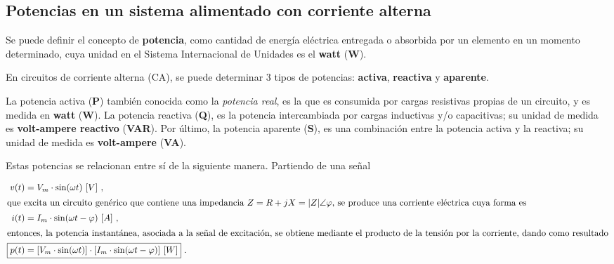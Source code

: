 \subsection{Potencias en un sistema alimentado con corriente alterna}

   Se puede definir el concepto de \textbf{potencia}, como cantidad de energía eléctrica 
  entregada o absorbida por un elemento en un momento determinado, cuya unidad en el Sistema 
  Internacional de Unidades es el \textbf{watt} (\textbf{W}).

   En circuitos de corriente alterna (CA), se puede determinar 3 tipos de potencias:
   \textbf{activa}, \textbf{reactiva} y \textbf{aparente}.

  La potencia activa (\textbf{P}) también conocida como la \textit{potencia real}, es la que
  es consumida por cargas resistivas propias de un circuito, y es medida 
  en \textbf{watt} (\textbf{W}). La potencia reactiva (\textbf{Q}), es la potencia 
  intercambiada por cargas inductivas y/o capacitivas; su unidad de medida es 
  \textbf{volt-ampere reactivo} (\textbf{VAR}). Por último, la potencia aparente (\textbf{S}),
  es una combinación entre la potencia activa y la reactiva; su unidad de medida es 
  \textbf{volt-ampere } (\textbf{VA}).

  Estas potencias se relacionan entre sí de la siguiente manera. Partiendo de una señal

        \begin{align}
            v(t)   &= V_m \cdot \sin(\omega t)\ [V] ~, \notag \\
            \intertext{que excita un circuito genérico que contiene una impedancia 
                        $Z = R + jX = |Z| \angle \varphi$,  se produce una corriente
                        eléctrica cuya forma es}
            i(t)   &= I_m \cdot \sin(\omega t - \varphi)\ [A] \ , \notag \\
            \intertext{entonces, la potencia instantánea, asociada a la señal de 
                excitación, se obtiene mediante el producto de la tensión por la 
                corriente, dando como resultado}
             \Aboxed{p(t)  &= [V_m \cdot \sin(\omega t)] 
                            \cdot [I_m \cdot \sin(\omega t - \varphi)]\ [W] } ~.
                            \label{eqn:Winst}
         \end{align}


